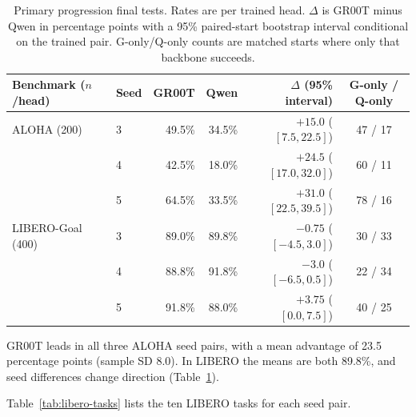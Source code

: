 \documentclass[conference]{IEEEtran}
\begin{document}
\begin{table}[t]
\centering\small\setlength{\tabcolsep}{5pt}
\caption{Primary progression final tests. Rates are per trained head. $\Delta$
is GR00T minus Qwen in percentage points with a 95\% paired-start bootstrap
interval conditional on the trained pair. G-only/Q-only counts are matched
starts where only that backbone succeeds.}
\label{tab:progression}
\begin{tabular*}{.94\textwidth}{@{\extracolsep{\fill}}llrrrc@{}}\toprule
Benchmark ($n$/head) & Seed & GR00T & Qwen & $\Delta$ (95\% interval) & G-only / Q-only\\\midrule
ALOHA (200) & 3 & 49.5\% & 34.5\% & $+15.0$ ($[7.5,22.5]$) & 47 / 17\\
 & 4 & 42.5\% & 18.0\% & $+24.5$ ($[17.0,32.0]$) & 60 / 11\\
 & 5 & 64.5\% & 33.5\% & $+31.0$ ($[22.5,39.5]$) & 78 / 16\\
LIBERO-Goal (400) & 3 & 89.0\% & 89.8\% & $-0.75$ ($[-4.5,3.0]$) & 30 / 33\\
 & 4 & 88.8\% & 91.8\% & $-3.0$ ($[-6.5,0.5]$) & 22 / 34\\
 & 5 & 91.8\% & 88.0\% & $+3.75$ ($[0.0,7.5]$) & 40 / 25\\\bottomrule
\end{tabular*}
\end{table}
GR00T leads in all three ALOHA seed pairs, with a mean advantage of
23.5 percentage points (sample SD 8.0). In LIBERO the means are both 89.8\%,
and seed differences change direction (Table~\ref{tab:progression}).

Table~\ref{tab:libero-tasks} lists the ten LIBERO tasks for each seed pair.
\end{document}
